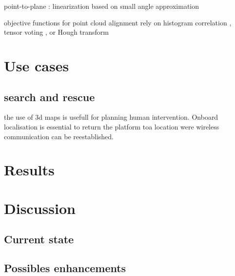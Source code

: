 \documentclass[twoside,twocolumn]{article}
\begin{document}
point-to-plane : linearization based on small angle approximation \cite{chen_object_1992}

objective functions for point cloud alignment rely on histogram correlation \cite{bosse_map_2008},
tensor voting \cite{reyes_registration_2007}, or Hough transform \cite{lowe_distinctive_2004}

\section{Use cases}

\subsection{search and rescue}
the use of 3d maps is usefull for planning human intervention.
Onboard localisation is essential to return the platform toa location were wireless communication can be reestablished.
\blindtext



\section{Results}
\blindtext


\section{Discussion}
\subsection{Current state}
\blindtext
\subsection{Possibles enhancements}
\blindtext

\printbibliography
\end{document}
